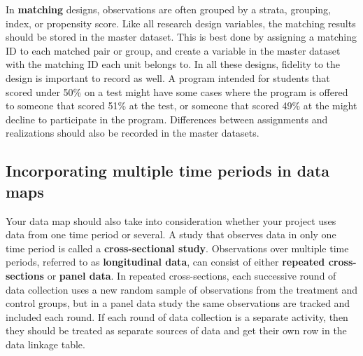 In \textbf{matching} designs, observations are often grouped
by a strata, grouping, index, or propensity score.
Like all research design variables, the matching results
should be stored in the master dataset.
This is best done by assigning a matching ID
to each matched pair or group,
and create a variable in the master dataset
with the matching ID each unit belongs to.
In all these designs, fidelity to the design is important to record as well.
A program intended for students that scored under 50\% on a test
might have some cases where the program is offered to someone that scored 51\% at the test,
or someone that scored 49\% at the might decline to participate in the program.
Differences between assignments and realizations
should also be recorded in the master datasets.


\subsection{Incorporating multiple time periods in data maps}

Your data map should also take into consideration
whether your project uses data from one time period or several.
A study that observes data in only one time period is called
a \textbf{cross-sectional study}.
Observations over multiple time periods,
referred to as \textbf{longitudinal data},
can consist of either
\textbf{repeated cross-sections}
or \textbf{panel data}.
In repeated cross-sections,
each successive round of data collection uses a new random sample
of observations from the treatment and control groups,
but in a panel data study
the same observations are tracked and included each round.
If each round of data collection is a separate activity,
then they should be treated as separate sources of data
and get their own row in the data linkage table.


